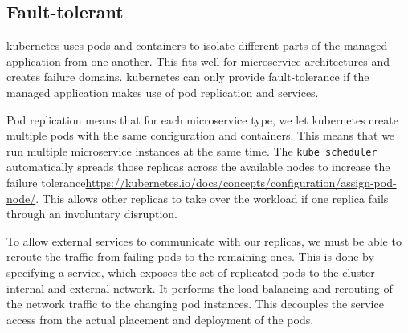 \subsection{Fault-tolerant}\label{sec:self-healing-kubernetes:fault-tolerant}
  \Gls{kubernetes} uses pods and containers to isolate different parts of the managed application from one another.
  This fits well for microservice architectures and creates failure domains.
  \Gls{kubernetes} can only provide fault-tolerance if the managed application makes use of pod replication and \glspl{service}.

  Pod replication means that for each microservice type, we let \gls{kubernetes} create multiple pods with the same configuration and containers.
  This means that we run multiple microservice instances at the same time.
  The \texttt{kube scheduler} automatically spreads those replicas across the available nodes to increase the failure tolerance{\url{https://kubernetes.io/docs/concepts/configuration/assign-pod-node/}}.
  This allows other replicas to take over the workload if one replica fails through an involuntary disruption.

  To allow external services to communicate with our replicas, we must be able to reroute the traffic from failing pods to the remaining ones.
  This is done by specifying a \gls{service}, which exposes the set of replicated pods to the cluster internal and external network.
  It performs the load balancing and rerouting of the network traffic to the changing pod instances.
  This decouples the service access from the actual placement and deployment of the pods.

